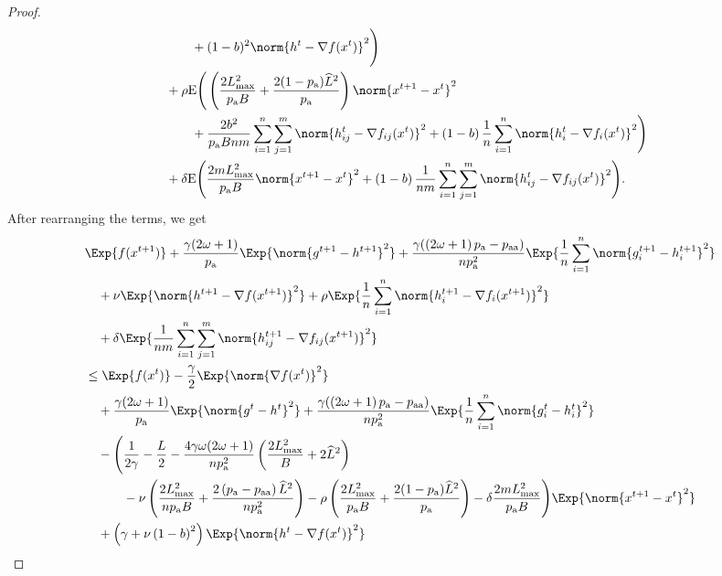 \documentclass{article}
\newcommand*{\probavailable}{\ensuremath{p_{\textnormal{a}}}}
\newcommand*{\probpairaa}{\ensuremath{p_{\textnormal{aa}}}}
\begin{document}
\begin{proof}
\begin{align*}
      &\qquad\quad + (1 - b)^2\norm{h^{t} - \nabla f(x^{t})}^2\Bigg) \\
      &\quad + \rho {\rm E}\Bigg(\left(\frac{2 L_{\max}^2}{\probavailable B} +\frac{2(1 - \probavailable) \widehat{L}^2}{\probavailable}\right) \norm{x^{t+1} - x^{t}}^2 \\
      &\qquad\quad + \frac{2 b^2}{\probavailable B n m} \sum_{i=1}^n \sum_{j=1}^m\norm{h^t_{ij} - \nabla f_{ij}(x^{t})}^2 +\left(1 - b\right) \frac{1}{n} \sum_{i=1}^n \norm{h^{t}_i - \nabla f_i(x^{t})}^2\Bigg)\\
      &\quad + \delta {\rm E}\Bigg(\frac{2 m L_{\max}^2}{\probavailable B} \norm{x^{t+1} - x^{t}}^2 + \left(1 - b\right) \frac{1}{nm} \sum_{i=1}^n \sum_{j=1}^m \norm{h^t_{ij} - \nabla f_{ij}(x^{t})}^2\Bigg).
    \end{align*}
    After rearranging the terms, we get
    \begin{align*}
      &\Exp{f(x^{t + 1})} + \frac{\gamma (2 \omega + 1)}{\probavailable} \Exp{\norm{g^{t+1} - h^{t+1}}^2} + \frac{\gamma (\left(2 \omega + 1\right)\probavailable - \probpairaa)}{n \probavailable^2} \Exp{\frac{1}{n}\sum_{i=1}^n\norm{g^{t+1}_i - h^{t+1}_i}^2}\\
      &\quad  + \nu \Exp{\norm{h^{t+1} - \nabla f(x^{t+1})}^2} + \rho \Exp{\frac{1}{n}\sum_{i=1}^n\norm{h^{t+1}_i - \nabla f_i(x^{t+1})}^2}\\
      &\quad + \delta \Exp{\frac{1}{nm}\sum_{i=1}^n\sum_{j=1}^m\norm{h^{t+1}_{ij} - \nabla f_{ij}(x^{t+1})}^2} \\
      &\leq \Exp{f(x^t)} - \frac{\gamma}{2}\Exp{\norm{\nabla f(x^t)}^2} \\
      &\quad + \frac{\gamma (2 \omega + 1)}{\probavailable} \Exp{\norm{g^{t} - h^{t}}^2} + \frac{\gamma (\left(2 \omega + 1\right)\probavailable - \probpairaa)}{n \probavailable^2} \Exp{\frac{1}{n}\sum_{i=1}^n\norm{g^{t}_i - h^{t}_i}^2} \\
      &\quad - \Bigg(\frac{1}{2\gamma} - \frac{L}{2} - \frac{4 \gamma \omega (2 \omega + 1)}{n \probavailable^2} \left(\frac{2 L_{\max}^2}{B} + 2 \widehat{L}^2\right) \\
      &\qquad\quad - \nu\left(\frac{2 L_{\max}^2}{n \probavailable B} + \frac{2 \left(\probavailable - \probpairaa\right) \widehat{L}^2}{n \probavailable^2}\right) - \rho \left(\frac{2 L_{\max}^2}{\probavailable B} +\frac{2(1 - \probavailable) \widehat{L}^2}{\probavailable}\right) - \delta \frac{2 m L_{\max}^2}{\probavailable B} \Bigg) \Exp{\norm{x^{t+1} - x^t}^2} \\
      &\quad + \left(\gamma + \nu \left(1 - b\right)^2\right) \Exp{\norm{h^{t} - \nabla f(x^{t})}^2} \\

\end{align*}
\end{proof}
\end{document}
